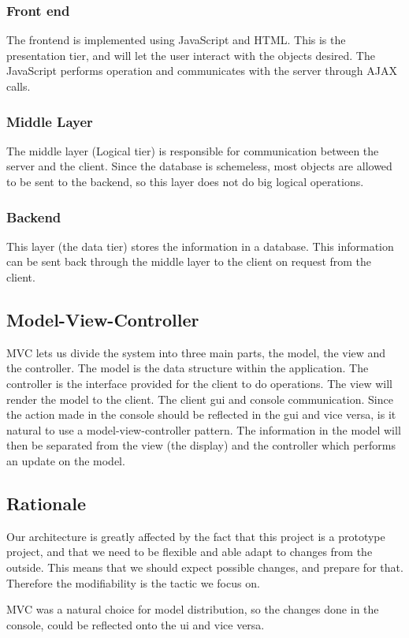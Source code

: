 \subsubsection{Front end}
The frontend is implemented using JavaScript and HTML. This is the presentation tier, and will let the user interact with the objects desired. The JavaScript performs operation and communicates with the server through AJAX calls. 

\subsubsection{Middle Layer}
The middle layer (Logical tier) is responsible for communication between the server and the client. Since the database is schemeless, most objects are allowed to be sent to the backend, so this layer does not do big logical operations.

\subsubsection{Backend}
This layer (the data tier) stores the information in a database. This information can be sent back through the middle layer to the client on request from the client. 


\subsection{Model-View-Controller}
MVC lets us divide the system into three main parts, the model, the view and the controller. The model is the data structure within the application. The controller is the interface provided for the client to do operations. The view will render the model to the client. 
The client gui and console communication. Since the action made in the console should be reflected in the gui and vice versa, is it natural to use a model-view-controller pattern. The information in the model will then be separated from the view (the display) and the controller which performs an update on the model. 


\subsection{Rationale} \label{Rationale}
Our architecture is greatly affected by the fact that this project is a prototype project, and that we need to be flexible and able adapt to changes from the outside. This means that we should expect possible changes, and prepare for that. Therefore the modifiability is the tactic we focus on.

MVC was a natural choice for model distribution, so the changes done in the console, could be reflected onto the ui and vice versa. 
